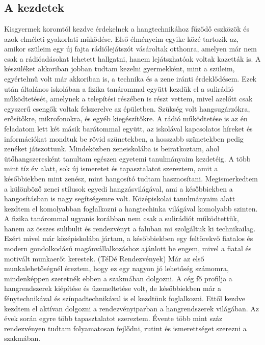\chapter{\bevezetes}

\section{A kezdetek}

Kisgyermek koromtól kezdve érdekelnek a hangtechnikához fűződő eszközök és azok elméleti-gyakorlati működése. Első élményeim egyike közé tartozik az, amikor
szüleim egy új fajta rádiólejátszót vásároltak otthonra, amelyen már nem csak a rádióadásokat lehetett hallgatni, hanem lejátszhatóak voltak kazetták is.
A készüléket akkoriban jobban tudtam kezelni gyermekként, mint a szüleim, egyértelmű volt már akkoriban is, a technika és a zene iránti érdeklődésem.
Ezek után általános iskolában a fizika tanárommal együtt kezdük el a sulirádió működtetését, amelynek a telepítési részében is részt vettem, mivel azelőtt
csak egyszerű csengők voltak felszerelve az épületben. Szükség volt hangsugárzókra, erősítőkre, mikrofonokra, és egyéb kiegészítőkre. A rádió működtetése
is az én feladatom lett két másik barátommal együtt, az iskolával kapcsolatos híreket és információkat mondtuk be rövid szünetekben, a hosszabb szünetekben pedig zenéket játszottunk.
Mindeközben zeneiskolába is beiratkoztam, ahol ütőhangszeresként tanultam egészen egyetemi tanulmányaim kezdetéig. A több mint tíz év alatt, sok új ismeretet és tapasztalatot szereztem,
amit a későbbiekben mint zenész, mint hangosító tudtam hasznosítani. Megismerkedtem a különböző zenei stílusok egyedi hangzásvilágával, ami a későbbiekben a hangosításban is nagy segítségemre volt.
Középiskolai tanulmányaim alatt kezdtem el komolyabban foglalkozni a hangtechinka világával komolyabb szinten. 
A fizika tanárommal ugyanis korábban nem csak a sulirádiót működtettük, hanem az összes sulibulit és rendezvényt a faluban mi szolgáltuk ki technikailag.
Ezért mivel már középiskolába jártam, a későbbiekben egy feltörekvő fiatalos és modern gondolkodású magánvállalkozáshoz ajánlott be engem, mivel a fiatal és motivált munkaerőt kerestek. (TéDé Rendezvények)
Már az első munkalehetőségnél éreztem, hogy ez egy nagyon jó lehetőség számomra, mindenképpen szeretnék ebben a szakmában dolgozni.
A cég fő profilja a hangrendszerek kiépítése és üzemeltetése volt, de későbbiekben már a fénytechnikával és színpadtechnikával is el kezdtünk foglalkozni. 
Ettől kezdve kezdtem el aktívan dolgozni a rendezvényiparban a hangrendszerek világában. Az évek során egyre több tapasztalatot
szereztem. Évente több mint száz rendezvényen tudtam folyamatosan fejlődni, rutint és ismerettséget szerezni a szakmában.

